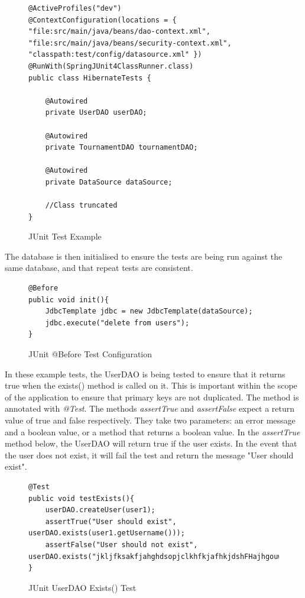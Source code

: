 \begin{figure}[H]
\begin{lstlisting}
@ActiveProfiles("dev")
@ContextConfiguration(locations = { "file:src/main/java/beans/dao-context.xml",
"file:src/main/java/beans/security-context.xml",
"classpath:test/config/datasource.xml" })
@RunWith(SpringJUnit4ClassRunner.class)
public class HibernateTests {
	
	@Autowired
	private UserDAO userDAO;
	
	@Autowired
	private TournamentDAO tournamentDAO;
	
	@Autowired
	private DataSource dataSource;
	
	//Class truncated 
}

\end{lstlisting}
\caption{JUnit Test Example}
\end{figure}

The database is then initialised to ensure the tests are being run against the same database, and that repeat tests are consistent.

\begin{figure}[H]
\begin{lstlisting}
@Before
public void init(){
	JdbcTemplate jdbc = new JdbcTemplate(dataSource);
	jdbc.execute("delete from users"); 
}
\end{lstlisting}
\caption{JUnit @Before Test Configuration}
\end{figure}

In these example tests, the UserDAO is being tested to ensure that it returns true when the exists() method is called on it. This is important within the scope of the application to ensure that primary keys are not duplicated. The method is annotated with \textit{@Test}. The methods \textit{assertTrue} and \textit{assertFalse} expect a return value of true and false respectively. They take two parameters: an error message and a boolean value, or a method that returns a boolean value. In the \textit{assertTrue} method below, the UserDAO will return true if the user exists. In the event that the user does not exist, it will fail the test and return the message "User should exist".\newline 

\begin{figure}[H]
\begin{lstlisting}
@Test
public void testExists(){
	userDAO.createUser(user1);
	assertTrue("User should exist", userDAO.exists(user1.getUsername()));
	assertFalse("User should not exist", userDAO.exists("jkljfksakfjahghdsopjclkhfkjafhkjdshFHajhgouwe"));
}
\end{lstlisting}
\caption{JUnit UserDAO Exists() Test}
\end{figure}

